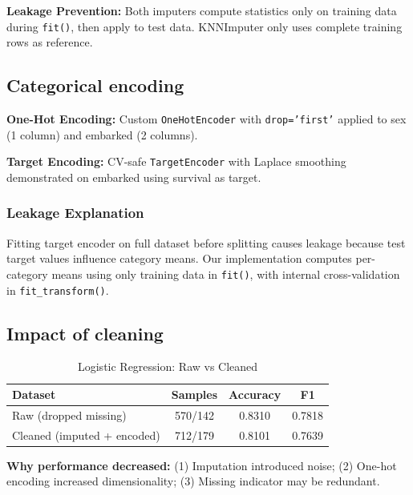 \documentclass[12pt]{article}
\begin{document}
\textbf{Leakage Prevention:} Both imputers compute statistics only on training data during \texttt{fit()}, then apply to test data. KNNImputer only uses complete training rows as reference.

\subsection{Categorical encoding}

\textbf{One-Hot Encoding:} Custom \texttt{OneHotEncoder} with \texttt{drop='first'} applied to sex (1 column) and embarked (2 columns).

\textbf{Target Encoding:} CV-safe \texttt{TargetEncoder} with Laplace smoothing demonstrated on embarked using survival as target.

\subsubsection*{Leakage Explanation}
Fitting target encoder on full dataset before splitting causes leakage because test target values influence category means. Our implementation computes per-category means using only training data in \texttt{fit()}, with internal cross-validation in \texttt{fit\_transform()}.

\subsection{Impact of cleaning}

\begin{table}[H]
\centering
\small
\caption{Logistic Regression: Raw vs Cleaned}
\begin{tabular}{l c c c}
\toprule
\textbf{Dataset} & \textbf{Samples} & \textbf{Accuracy} & \textbf{F1} \\
\midrule
Raw (dropped missing) & 570/142 & 0.8310 & 0.7818 \\
Cleaned (imputed + encoded) & 712/179 & 0.8101 & 0.7639 \\
\bottomrule
\end{tabular}
\end{table}

\textbf{Why performance decreased:} (1) Imputation introduced noise; (2) One-hot encoding increased dimensionality; (3) Missing indicator may be redundant.

\end{document}

